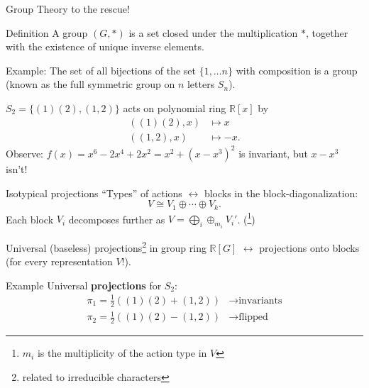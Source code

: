 \begin{frame}{Group Theory to the rescue!}
  \begin{block}{Definition}
    A \alert{group} $(G, *)$ is a set closed under the multiplication $*$, together with the existence of unique inverse elements.
  \end{block}
    {\small Example: The set of all bijections of the set $\{1,\ldots n\}$ with composition is a group (known as the full symmetric group on $n$ letters $S_n$).}

    $S_2 = \{(1)(2), (1,2)\}$ \alert{acts} on polynomial ring $\mathbb{R}[x]$ by
    \begin{align*}
      ((1)(2), x) & \mapsto x\\
      ((1, 2), x) & \mapsto -x.
    \end{align*}
    {\small 
    Observe: $f(x) = x^6 - 2x^4 + 2x^2 = x^2 + (x-x^3)^2$ is invariant, but $x-x^3$ isn't!}

\end{frame}


\begin{frame}{Isotypical projections}
    ``Types'' of actions $\leftrightarrow$  blocks in the block-diagonalization:
    \[V \cong V_1 \oplus \cdots \oplus V_k.\]
    Each block $V_i$ decomposes further as
    $V = \bigoplus_i \oplus_{m_i} V_i'$. (\footnote{$m_i$ is the multiplicity of the action type in $V$})

    Universal (baseless) \alert{projections}\footnote{related to irreducible characters} in group ring $\mathbb{R}[G]$ $\leftrightarrow$ projections onto blocks (for every representation $V$!).
%
    \begin{block}{Example}
    \small
    Universal \textbf{projections} for $S_2$:\\[-0.2in]
    \begin{align*}
      \pi_1 = \frac{1}{2}((1)(2) + (1,2)) & \to\text{invariants}\\
      \pi_2 = \frac{1}{2}((1)(2) - (1,2)) & \to\text{flipped}
    \end{align*}
    \end{block}

\end{frame}

